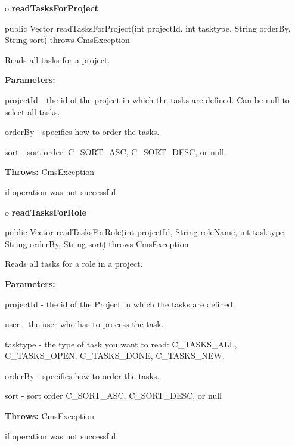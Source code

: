 o {\bf readTasksForProject}

\begin{PRE}
 public Vector readTasksForProject(int projectId,
                                   int tasktype,
                                   String orderBy,
                                   String sort) throws CmsException
\end{PRE}

\begin{description}
\htmlDD Reads all tasks for a project.

\begin{description}
\item {\bf Parameters:}

projectId - the id of the project in which the tasks are defined. Can be null
to select all tasks.

orderBy - specifies how to order the tasks.

sort - sort order: C\_SORT\_ASC, C\_SORT\_DESC, or null.
\item {\bf Throws:} CmsException

if operation was not successful.
\end{description}

\end{description}

o {\bf readTasksForRole}

\begin{PRE}
 public Vector readTasksForRole(int projectId,
                                String roleName,
                                int tasktype,
                                String orderBy,
                                String sort) throws CmsException
\end{PRE}

\begin{description}
\htmlDD Reads all tasks for a role in a project.

\begin{description}
\item {\bf Parameters:}

projectId - the id of the Project in which the tasks are defined.

user - the user who has to process the task.

tasktype - the type of task you want to read: C\_TASKS\_ALL, C\_TASKS\_OPEN,
C\_TASKS\_DONE, C\_TASKS\_NEW.

orderBy - specifies how to order the tasks.

sort - sort order C\_SORT\_ASC, C\_SORT\_DESC, or null
\item {\bf Throws:} CmsException

if operation was not successful.
\end{description}

\end{description}

